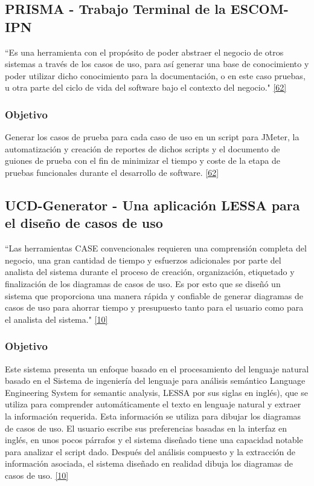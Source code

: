 \subsection{PRISMA - Trabajo Terminal de la ESCOM-IPN}
``Es una herramienta con el propósito de poder abstraer el negocio de otros sistemas a
través de los casos de uso, para así generar una base de conocimiento y poder utilizar dicho conocimiento para la documentación, o en este caso pruebas, u otra parte del ciclo de vida del software bajo el contexto del negocio." \hyperlink{b62}{[62]}

\subsubsection{Objetivo}
Generar los casos de prueba para cada caso de uso en un script para JMeter, la
automatización y creación de reportes de dichos scripts y el documento de guiones de prueba con el fin de minimizar el tiempo y coste de la etapa de pruebas funcionales durante el desarrollo de software. \hyperlink{b62}{[62]}

\subsection{UCD-Generator - Una aplicación LESSA para el diseño de casos de uso}

``Las herramientas CASE convencionales requieren una comprensión completa del negocio, una gran cantidad de tiempo y esfuerzos adicionales por parte del analista del sistema durante el proceso de creación, organización, etiquetado y finalización de los diagramas de casos de uso. Es por esto que se diseñó un sistema que proporciona una manera rápida y confiable de generar diagramas de casos de uso para ahorrar tiempo y presupuesto tanto para el usuario como para el analista del sistema."  \hyperlink{b10}{[10]}

\subsubsection{Objetivo}
Este sistema presenta un enfoque basado en el procesamiento del lenguaje natural basado en el Sistema de ingeniería del lenguaje para análisis semántico Language Engineering System for semantic analysis, LESSA por sus siglas en inglés), que se utiliza para comprender automáticamente el texto en lenguaje natural y extraer la información requerida. Esta información se utiliza para dibujar los diagramas de casos de uso. El usuario escribe sus preferencias basadas en la interfaz en inglés, en unos pocos párrafos y el sistema diseñado tiene una capacidad notable para analizar el script dado. Después del análisis compuesto y la extracción de información asociada, el sistema diseñado en realidad dibuja los diagramas de casos de uso. \hyperlink{b10}{[10]}

